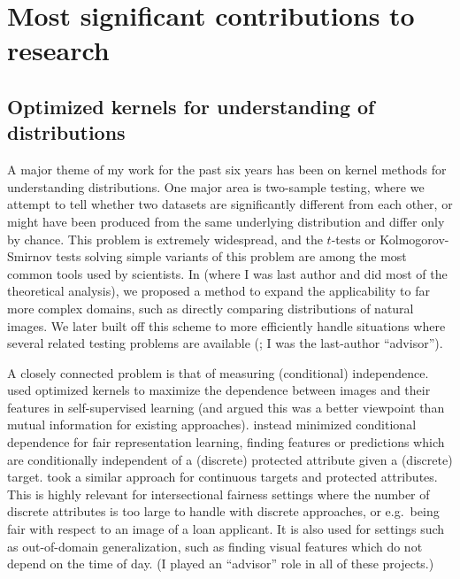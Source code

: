\documentclass[12pt]{article}
\begin{document}
\nocite{*}

\section{Most significant contributions to research}

\subsection{Optimized kernels for understanding of distributions} \label{sec:testing}

A major theme of my work for the past six years has been on kernel methods for understanding distributions.
One major area is two-sample testing,
where we attempt to tell whether two datasets are significantly different from each other,
or might have been produced from the same underlying distribution and differ only by chance.
This problem is extremely widespread,
and the $t$-tests or Kolmogorov-Smirnov tests solving simple variants of this problem
are among the most common tools used by scientists.
In \cite{liu:deep-testing} (where I was last author and did most of the theoretical analysis),
we proposed a method to expand the applicability to far more complex domains,
such as directly comparing distributions of natural images.
We later built off this scheme to more efficiently handle situations where several related testing problems are available (\cite{liu:meta-2st}; I was the last-author ``advisor'').

A closely connected problem is that of measuring (conditional) independence.
\cite{li:ssl-hsic} used optimized kernels to maximize the dependence between images and their features in self-supervised learning
(and argued this was a better viewpoint than mutual information for existing approaches).
\Cite{deka:mmd-bfair} instead minimized conditional dependence for fair representation learning,
finding features or predictions which are conditionally independent of a (discrete) protected attribute given a (discrete) target.
\cite{pogodin:circe} took a similar approach for continuous targets and protected attributes.
This is highly relevant for intersectional fairness settings where the number of discrete attributes is too large to handle with discrete approaches,
or e.g.\ being fair with respect to an image of a loan applicant.
It is also used for settings such as out-of-domain generalization,
such as finding visual features which do not depend on the time of day.
(I played an ``advisor'' role in all of these projects.)
\end{document}
